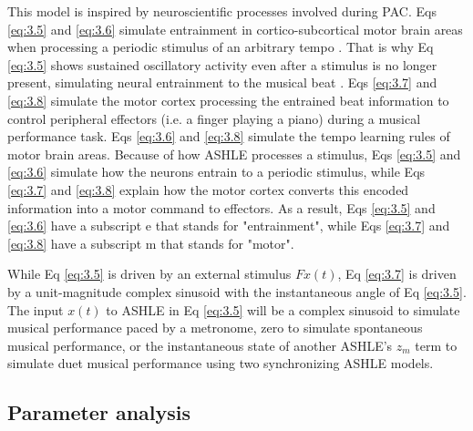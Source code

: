 \documentclass{report}
\begin{document}
This model is inspired by neuroscientific processes involved during PAC. Eqs \eqref{eq:3.5} and \eqref{eq:3.6} simulate entrainment in cortico-subcortical motor brain areas when processing a periodic stimulus of an arbitrary tempo \cite{daly2014changes, grahn2009feeling, grahn2013finding}. That is why Eq \eqref{eq:3.5} shows sustained oscillatory activity even after a stimulus is no longer present, simulating neural entrainment to the musical beat \cite{large2015neural}. Eqs \eqref{eq:3.7} and \eqref{eq:3.8} simulate the motor cortex processing the entrained beat information to control peripheral effectors (i.e. a finger playing a piano) during a musical performance task. Eqs \eqref{eq:3.6} and \eqref{eq:3.8} simulate the tempo learning rules of motor brain areas. Because of how ASHLE processes a stimulus, Eqs \eqref{eq:3.5} and \eqref{eq:3.6} simulate how the neurons entrain to a periodic stimulus, while Eqs \eqref{eq:3.7} and \eqref{eq:3.8} explain how the motor cortex converts this encoded information into a motor command to effectors. As a result, Eqs \eqref{eq:3.5} and \eqref{eq:3.6} have a subscript e that stands for "entrainment", while Eqs \eqref{eq:3.7} and \eqref{eq:3.8} have a subscript m that stands for "motor".

While Eq \eqref{eq:3.5} is driven by an external stimulus $Fx(t)$, Eq \eqref{eq:3.7} is driven by a unit-magnitude complex sinusoid with the instantaneous angle of Eq \eqref{eq:3.5}. The input $x(t)$ to ASHLE in Eq \eqref{eq:3.5} will be a complex sinusoid to simulate musical performance paced by a metronome, zero to simulate spontaneous musical performance, or the instantaneous state of another ASHLE's $z_m$ term to simulate duet musical performance using two synchronizing ASHLE models.

\subsection{Parameter analysis}
\end{document}
